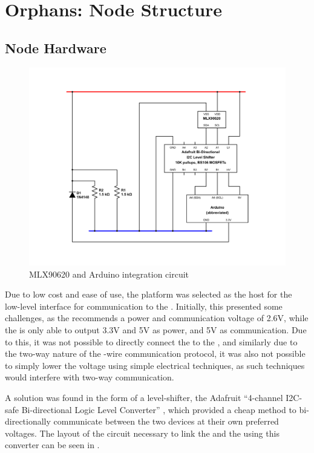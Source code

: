 \documentclass[../thesis/thesis.tex]{subfiles}
\begin{document}
 \chapter{Orphans: Node Structure}

\section{Node Hardware}
 
\begin{figure}
\centering
\includegraphics[width=\textwidth]{../diagrams/mlx-arduino.pdf}
\caption{MLX90620 and Arduino integration circuit}
\label{fig:circuits:node}
\end{figure}

Due to low cost and ease of use, the \ard platform was selected as the host for the low-level \iic interface for communication to the \mlx. Initially, this presented some challenges, as the \mlx recommends a power and communication voltage of 2.6V, while the \ard is only able to output 3.3V and 5V as power, and 5V as communication. Due to this, it was not possible to directly connect the \ard to the \mlx, and similarly due to the two-way nature of the -wire communication protocol, it was also not possible to simply lower the \ard voltage using simple electrical techniques, as such techniques would interfere with two-way communication.

A solution was found in the form of a \iic level-shifter, the Adafruit ``4-channel I2C-safe Bi-directional Logic Level Converter'' \cite{AdafruitI2C}, which provided a cheap method to bi-directionally communicate between the two devices at their own preferred voltages. The layout of the circuit necessary to link the \ard and the \mlx using this converter can be seen in .
\end{document}

